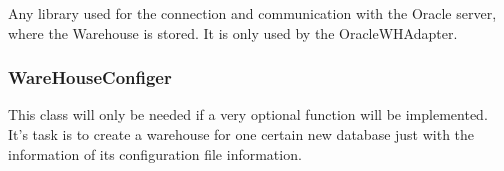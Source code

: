 Any library used for the connection and communication with the Oracle server, 
where the Warehouse is stored. It is only used by the OracleWHAdapter.



\subsubsection*{WareHouseConfiger}

This class will only be needed if a very optional function will be implemented. It's task is to create
a warehouse for one certain new database just with the information of its configuration file information.

